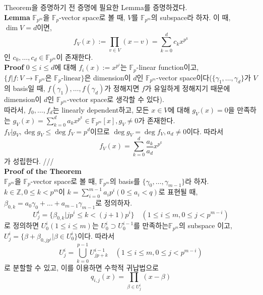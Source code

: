 \documentclass[11pt]{article}
\begin{document}
Theorem을 증명하기 전 증명에 필요한 Lemma를 증명하겠다.\\
\textbf{Lemma} $\mathbb{F}_{p^{m}}$을 $\mathbb{F}_{p}$-vector space로 볼 때, $V$를 $\mathbb{F}_{p^{m}}$의 subspace라 하자. 이 때,$\dim V=d$이면, 
\begin{displaymath}
f_{V}(x):=\prod_{v\in V}(x-v)=\sum_{k=0}^{d}c_{k}x^{p^{k}}
\end{displaymath}
인 $c_{0},\dots,c_{d}\in \mathbb{F}_{p^{m}}$이 존재한다.\\
\textbf{Proof} $0\leq i\leq d$에 대해 $f_{i}(x):=x^{p^{i}}$는 $\mathbb{F}_{p}$-linear function이고, $\{f\vert f:V\to\mathbb{F}_{p^{m}}\textrm{은 }\mathbb{F}_{p}\textrm{-linear}\}$은 dimension이 $d$인 $\mathbb{F}_{p^{m}}$-vector space이다($\{\gamma_{1},\dots,\gamma_{d}\}$가 $V$의 basis일 때, $f(\gamma_{1}),\dots,f(\gamma_{d})$가 정해지면 $f$가 유일하게 정해지기 때문에 dimension이 $d$인 $\mathbb{F}_{p^{m}}$-vector space로 생각할 수 있다).\\
따라서, $f_{0},\dots,f_{d}$는 linearly dependent하고, 모든 $x\in V$에 대해 $g_{V}(x)=0$을 만족하는 $g_{V}(x)=\sum_{k=0}^{d}a_{k}x^{p^{k}}\in\mathbb{F}_{p^{m}}[x], g_{V}\neq 0 $가 존재한다.$f_{V}\vert g_{V}, \deg g_{V}\leq \deg f_{V}=p^{d}$이므로 $\deg g_{V}=\deg f_{V},a_{d}\neq 0$이다. 따라서
\begin{displaymath}
f_{V}(x)=\sum_{k=0}^{d}\frac{a_{k}}{a_{d}}x^{p^{k}}
\end{displaymath}
가 성립한다. ///\\
\textbf{Proof of the Theorem}\\
$\mathbb{F}_{p^{m}}$을 $\mathbb{F}_{p}$-vector space로 볼 때, $\mathbb{F}_{p^{m}}$의 basis를 $\{\gamma_{0},\dots,\gamma_{m-1}\}$라 하자. $k\in\mathbb{Z},0\leq k<p^m$이 $k=\sum_{i=0}^{m-1}a_{i}p^{i}(0\leq a_{i}<q)$로 표현될 때, $\beta_{0,k}=a_{0}\gamma_{0}+\dots+a_{m-1}\gamma_{m-1}$로 정의하자.
\begin{displaymath}
U_{j}^{i}=\{\beta_{0,k}\vert jp^{i}\leq k< (j+1)p^{i}\}\quad(1\leq i\leq m,0\leq j< p^{m-i})
\end{displaymath}
로 정의하면 $U_{0}^{i}(1\leq i\leq m)$는 $U_{0}^{i}\supset U_{0}^{i-1}$를 만족하는$\mathbb{F}_{p^{m}}$의  subspace 이고,\\
 $U_{j}^{i}=\{\beta+\beta_{0,jp^{i}}\vert \beta\in U_{0}^{i}\}$이다. 따라서
 \begin{displaymath}
U_{j}^{i}=\bigcup_{k=0}^{p-1}U_{jp+k}^{i-1}\quad(1\leq i\leq m,0\leq j< p^{m-i})
\end{displaymath}
로 분할할 수 있고, 이를 이용하면 수학적 귀납법으로
\begin{displaymath}
q_{i,j}(x)=\prod_{\beta\in U_{j}^{i}}(x-\beta)
\end{displaymath}
\end{document}

